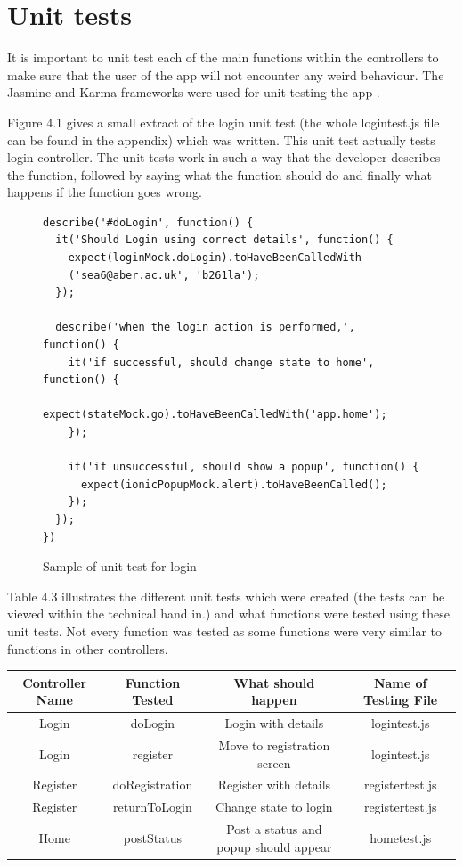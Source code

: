\section{Unit tests}
It is important to unit test each of the main functions within the controllers to make sure that the user of the app will not encounter any weird behaviour. The Jasmine and Karma frameworks were used for unit testing the app \cite{testing}.

Figure 4.1 gives a small extract of the login unit test (the whole logintest.js file can be found in the appendix) which was written. This unit test actually tests login controller. The unit tests work in such a way that the developer describes the function, followed by saying what the function should do and finally what happens if the function goes wrong. 

\begin{figure}[H]

\begin{verbatim}
describe('#doLogin', function() {
  it('Should Login using correct details', function() {
    expect(loginMock.doLogin).toHaveBeenCalledWith
    ('sea6@aber.ac.uk', 'b261la'); 
  });

  describe('when the login action is performed,', function() {
    it('if successful, should change state to home', function() {
      expect(stateMock.go).toHaveBeenCalledWith('app.home');
    });

    it('if unsuccessful, should show a popup', function() {
      expect(ionicPopupMock.alert).toHaveBeenCalled();
    });
  });
})
\end{verbatim}
\caption{Sample of unit test for login}
\end{figure}

Table 4.3 illustrates the different unit tests which were created (the tests can be viewed within the technical hand in.) and what functions were tested using these unit tests. Not every function was tested as some functions were very similar to functions in other controllers.

\begin{tabular} {||c c c c||}  
\hline
 Controller Name & Function Tested & What should happen & Name of Testing File\\
 \hline
 \hline 
 Login & doLogin & Login with details & logintest.js \\
 \hline
 Login & register &Move to registration screen & logintest.js \\
 \hline
 Register & doRegistration & Register with details & registertest.js \\
 \hline
 Register & returnToLogin & Change state to login & registertest.js \\
 \hline
 Home & postStatus & Post a status and popup should appear & hometest.js \\
 \hline
 \end{tabular}


